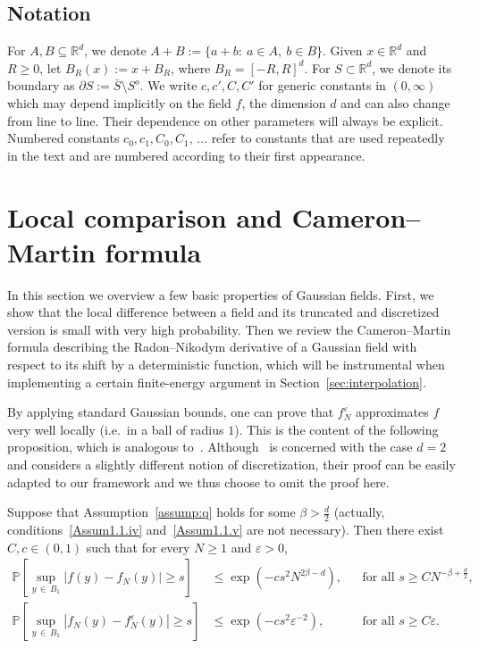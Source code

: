 \documentclass[10pt]{amsart}
\theoremstyle{definition}\newtheorem{defi}[theo]{Definition}\newtheorem{rema}[theo]{Remark}\newtheorem{exam}[theo]{Example}\newtheorem{exem}[theo]{Example}\newtheorem{nota}[theo]{Notation}
\renewcommand{\P}{\mathbb{P}}
\newcommand{\R}{\mathbb{R}}
\begin{document}
\subsection*{Notation}
For $A,B\subseteq\R^d$, we denote $A+B:=\{a+b:~a\in A,~b\in B\}$. Given $x\in \R^d$ and $R\geq 0$, let $B_R(x):= x + B_R$, where $B_R=[-R,R]^d$. For $S\subset \R^d$, we denote its boundary as $\partial S:=\bar{S}\setminus S^o$. We write $c,c',C,C'$ for generic constants in $(0,\infty)$ which may depend implicitly on the field $f$, the dimension $d$ and can also change from line to line. Their dependence on other parameters will always be explicit. Numbered constants $c_0,c_1,C_0,C_1,\,\dots$ refer to constants that are used repeatedly in the text and are numbered according to their first appearance.


\section{Local comparison and Cameron--Martin formula}

In this section we overview a few basic properties of Gaussian fields. First, we show that the local difference between a field and its truncated and discretized version is small with very high probability. Then we review the Cameron--Martin formula describing the Radon--Nikodym derivative of a Gaussian field with respect to its shift by a deterministic function, which will be instrumental when implementing a certain finite-energy argument in Section~\ref{sec:interpolation}.

By applying standard Gaussian bounds, one can prove that $f_N^\varepsilon$ approximates $f$ very well locally (i.e.~in a ball of radius $1$). This is the content of the following proposition, which is analogous to~\cite[Proposition~3.11]{MV}. Although~\cite{MV} is concerned with the case $d=2$ and considers a slightly different notion of discretization, their proof can be easily adapted to our framework and we thus choose to omit the proof here.

\begin{prop}\label{prop:local_comp}
Suppose that Assumption~\ref{assump:q} holds for some $\beta>\frac{d}{2}$ (actually, conditions~\eqref{Assum1.1.iv} and~\eqref{Assum1.1.v} are not necessary). Then there exist $C,c\in(0,1)$ such that for every $N\geq1$ and $\varepsilon>0$,
\begin{align}
\P\left[\sup_{y\,\in\,B_1}\left|f(y)-f_N(y)\right| \geq s \right] &\leq \exp\left(-cs^2 N^{2\beta-d}\right), &&\text{for all } s\geq CN^{-\beta+\frac{d}{2}},\label{eq:local_comp_r}\\
\P\left[\sup_{y\,\in\,B_1}\left|f_N(y)-f_N^\varepsilon(y)\right|\geq s \right] &\leq \exp\left(-cs^2 \varepsilon^{-2}\right), &&\text{for all } s\geq C\varepsilon.\label{eq:local_comp_epsilon}
\end{align}
\end{prop}
\end{document}
